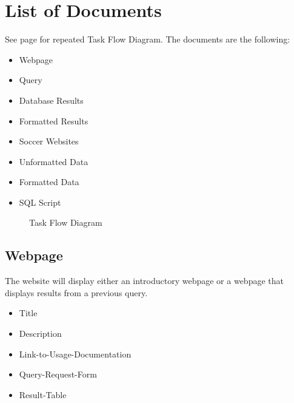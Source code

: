 \documentclass{article}
\begin{document}
\newpage

\section{List of Documents}
See page \pageref{taskflow2} for repeated Task Flow Diagram. The documents are the following:
\begin{itemize}
	\item Webpage
	\item Query 
	\item Database Results
	\item Formatted Results
	\item Soccer Websites
	\item Unformatted Data
	\item Formatted Data
	\item SQL Script
\end{itemize}

\begin{figure}[ph]
	\caption{Task Flow Diagram}
	\label{taskflow2}
\end{figure}

\clearpage

\subsection{Webpage}
The website will display either an introductory webpage or a webpage that
displays results from a previous query. 
\begin{itemize}
	\item Title
	\item Description
	\item Link-to-Usage-Documentation 
	\item Query-Request-Form
	\item Result-Table
\end{itemize}
\end{document}
